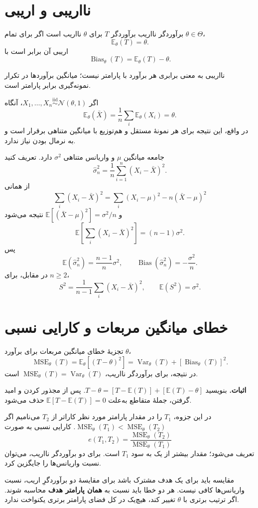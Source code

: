 \documentclass[12pt,a4paper,oneside]{report}
\newcounter{ex}[chapter]
\newenvironment{example}[1]{\refstepcounter{ex}\begin{tcolorbox}[breakable=false,title={مثال \thechapter.\arabic{ex} | #1},colframe=muted,colback=white]}{\end{tcolorbox}}
\newcommand{\E}{\mathbb E}
\newcommand{\Var}{\operatorname{Var}}
\newcommand{\MSE}{\operatorname{MSE}}
\newcommand{\Bias}{\operatorname{Bias}}
\newcommand{\iid}{\overset{\mathrm{iid}}{\sim}}
\newcommand{\N}{\mathcal N}
\begin{document}
\section{نااریبی و اریبی}
\begin{definition}{برآوردگر نااریب}
برآوردگر $T$ برای $\theta$ نااریب است اگر برای تمام $\theta\in\Theta$،
\[\E_\theta(T)=\theta.\]
اریبی آن برابر است با
\[\Bias_\theta(T)=\E_\theta(T)-\theta.\]
\end{definition}
نااریبی به معنی برابری هر برآورد با پارامتر نیست؛ میانگین برآوردها در تکرار نمونه‌گیری برابر پارامتر است.
\begin{example}{نااریبی میانگین نمونه}
اگر $X_1,\ldots,X_n\iid\N(\theta,1)$، آنگاه
\[\E_\theta(\bar X)=\frac1n\sum_i\E_\theta(X_i)=\theta.\]
در واقع، این نتیجه برای هر نمونهٔ مستقل و هم‌توزیع با میانگین متناهی برقرار است و به نرمال بودن نیاز ندارد.
\end{example}
\begin{example}{چرا در واریانس نمونه بر $n-1$ تقسیم می‌کنیم؟}
جامعه میانگین $\mu$ و واریانس متناهی $\sigma^2$ دارد. تعریف کنید
\[\widehat\sigma_n^2=\frac1n\sum_{i=1}^n(X_i-\bar X)^2.\]
از همانی
\[\sum_i(X_i-\bar X)^2=\sum_i(X_i-\mu)^2-n(\bar X-\mu)^2\]
و $\E[(\bar X-\mu)^2]=\sigma^2/n$ نتیجه می‌شود
\[
\E\left[\sum_i(X_i-\bar X)^2\right]=(n-1)\sigma^2.
\]
پس
\[\E(\widehat\sigma_n^2)=\frac{n-1}{n}\sigma^2,\qquad
\Bias(\widehat\sigma_n^2)=-\frac{\sigma^2}{n}.\]
در مقابل، برای $n\ge2$،
\[\boxed{S^2=\frac1{n-1}\sum_i(X_i-\bar X)^2,\qquad \E(S^2)=\sigma^2.}\]
\end{example}
\section{خطای میانگین مربعات و کارایی نسبی}
\begin{result}{تجزیهٔ خطای میانگین مربعات}
برای برآورد $\theta$،
\[
\MSE_\theta(T)=\E_\theta[(T-\theta)^2]
=\Var_\theta(T)+[\Bias_\theta(T)]^2.
\]
در نتیجه، برای برآوردگر نااریب، $\MSE_\theta(T)=\Var_\theta(T)$ است.
\end{result}
\textbf{اثبات.} بنویسید $T-\theta=[T-\E(T)]+[\E(T)-\theta]$. پس از مجذور کردن و امید گرفتن، جملهٔ متقاطع به‌علت $\E[T-\E(T)]=0$ حذف می‌شود.

در این جزوه، $T_1$ را در مقدار پارامتر مورد نظر کاراتر از $T_2$ می‌نامیم اگر $\MSE_\theta(T_1)<\MSE_\theta(T_2)$. کارایی نسبی به صورت
\[
e(T_1,T_2)=\frac{\MSE_\theta(T_2)}{\MSE_\theta(T_1)}
\]
تعریف می‌شود؛ مقدار بیشتر از یک به سود $T_1$ است. برای دو برآوردگر نااریب، می‌توان نسبت واریانس‌ها را جایگزین کرد.
\begin{important}{مقایسه باید برای یک هدف مشترک باشد}
برای مقایسهٔ دو برآوردگرِ اریب، نسبت واریانس‌ها کافی نیست. هر دو خطا باید نسبت به \textbf{همان پارامتر هدف} محاسبه شوند. اگر ترتیب برتری با $\theta$ تغییر کند، هیچ‌یک در کل فضای پارامتر برتری یکنواخت ندارد.
\end{important}
\end{document}
